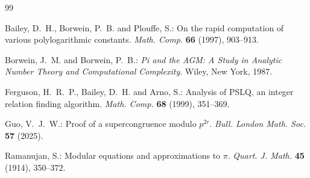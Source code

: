 \documentclass{article}
\theoremstyle{plain}
\theoremstyle{definition}
\theoremstyle{remark}
\numberwithin{equation}{section}
\begin{document}
\begin{thebibliography}{99}


Bailey, D.~H., Borwein, P.~B. and Plouffe, S.: On the rapid computation of various polylogarithmic constants.
\emph{Math. Comp.} \textbf{66} (1997), 903--913.

Borwein, J.~M. and Borwein, P.~B.: \emph{Pi and the AGM: A Study in Analytic Number Theory and Computational Complexity}.
Wiley, New York, 1987.

Ferguson, H.~R.~P., Bailey, D.~H. and Arno, S.: Analysis of PSLQ, an integer relation finding algorithm.
\emph{Math. Comp.} \textbf{68} (1999), 351--369.

Guo, V.~J.~W.: Proof of a supercongruence modulo $p^{2r}$.
\emph{Bull. London Math. Soc.} \textbf{57} (2025).

Ramanujan, S.: Modular equations and approximations to $\pi$.
\emph{Quart. J. Math.} \textbf{45} (1914), 350--372.

\end{thebibliography}
\end{document}
